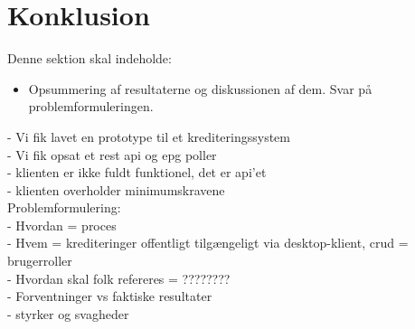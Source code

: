 \section{Konklusion}
Denne sektion skal indeholde:

\begin{itemize}
    \item Opsummering af resultaterne og diskussionen af dem. Svar på problemformuleringen. 
\end{itemize}{}


- Vi fik lavet en prototype til et krediteringssystem \\
- Vi fik opsat et rest api og epg poller \\
- klienten er ikke fuldt funktionel, det er api'et \\
- klienten overholder minimumskravene \\
Problemformulering: \\
- Hvordan = proces \\
- Hvem = krediteringer offentligt tilgængeligt via desktop-klient, crud = brugerroller \\
- Hvordan skal folk refereres = ???????? \\
- Forventninger vs faktiske resultater \\
- styrker og svagheder \\